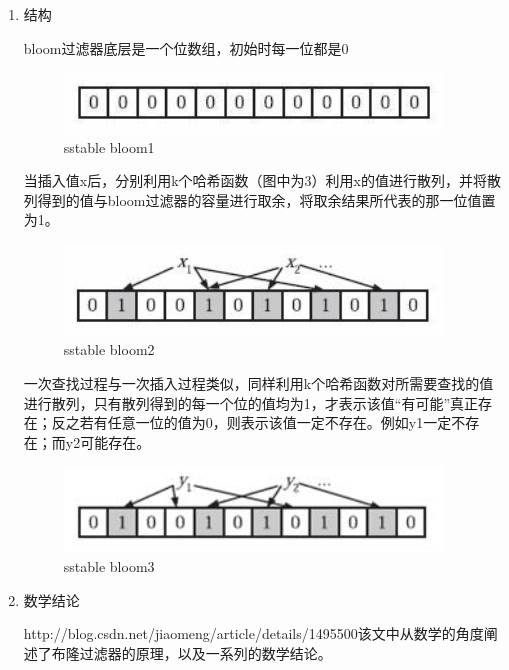		\begin{enumerate}
			\item 结构 
			
			bloom过滤器底层是一个位数组，初始时每一位都是0 

			\begin{figure}[H]
				\centering
				\includegraphics[width=0.95\textwidth]{images/bloom1}
				\caption{sstable bloom1}
				\label{sstable_bloom1}
			\end{figure}

当插入值x后，分别利用k个哈希函数（图中为3）利用x的值进行散列，并将散列得到的值与bloom过滤器的容量进行取余，将取余结果所代表的那一位值置为1。

\begin{figure}[H]
	\centering
	\includegraphics[width=0.95\textwidth]{images/bloom2}
	\caption{sstable bloom2}
	\label{sstable_bloom2}
\end{figure}

一次查找过程与一次插入过程类似，同样利用k个哈希函数对所需要查找的值进行散列，只有散列得到的每一个位的值均为1，才表示该值“有可能”真正存在；反之若有任意一位的值为0，则表示该值一定不存在。例如y1一定不存在；而y2可能存在。

\begin{figure}[H]
	\centering
	\includegraphics[width=0.95\textwidth]{images/bloom3}
	\caption{sstable bloom3}
	\label{sstable_bloom3}
\end{figure}

			\item 数学结论
			
			http://blog.csdn.net/jiaomeng/article/details/1495500该文中从数学的角度阐述了布隆过滤器的原理，以及一系列的数学结论。


\end{enumerate}
